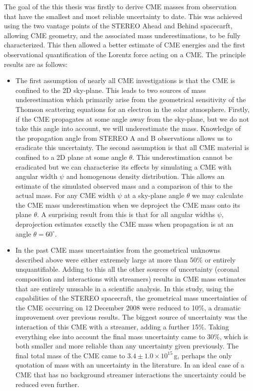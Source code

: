 The goal of the this thesis was firstly to derive CME masses from observation that have the smallest and most reliable uncertainty to date. This was achieved using the two vantage points of the STEREO Ahead and Behind spacecarft, allowing CME geometry, and the associated mass underestimations, to be fully characterized. This then allowed a better estimate of CME energies and the first observational quantification of the Lorentz force acting on a CME. The principle results are as follows:
\begin{itemize}
\item The first assumption of nearly all CME investigations is that the CME is confined to the 2D sky-plane. This leads to two sources of mass underestimation which primarily arise from the geometrical sensitivity of the Thomson scattering equations for an electron in the solar atmosphere. Firstly, if the CME propagates at some angle away from the sky-plane, but we do not take this angle into account, we will underestimate the mass. Knowledge of the propagation angle from STEREO A and B observations allows us to eradicate this uncertainty. The second assumption is that all CME material is confined to a 2D plane at some angle $\theta$. This underestimation cannot be eradicated but we can characterise its effects by simulating a CME with angular width $\psi$ and homogenous density distribution. This allows an estimate of the simulated observed mass and a comparison of this to the actual mass. For any CME width $\psi$ at a sky-plane angle $\theta$ we may calculate the CME mass underestimation when we deproject the CME mass onto its plane $\theta$. A surprising result from this is that for all angular widths $\psi$, deprojection estimates exactly the CME mass when propagation is at an angle $\theta=60^{\circ}$.

\item In the past CME mass uncertainties from the geometrical unknowns described above were either extremely large at more than 50\% \citep{vou00} or entirely unquantifiable. Adding to this all the other sources of uncertainty (coronal composition and interactions with streamers) results in CME mass estimates that are entirely unusable in a scientific analysis. In this study, using the capabilities of the STEREO spacecraft, the geometrical mass uncertainties of the CME occurring on 12 December 2008 were reduced to 10\%, a dramatic improvement over previous results. The biggest source of uncertainty was the interaction of this CME with a streamer, adding a further 15\%. Taking everything else into account the final mass uncertainty came to 30\%, which is both smaller and more reliable than any uncertainty given previously. The final total mass of the CME came to
$3.4\pm1.0\times10^{15}$\,g, perhaps the only quotation of mass with an uncertainty in the literature. In an ideal case of a CME that has no background streamer interactions the uncertainty could be reduced even further.


\end{itemize}
